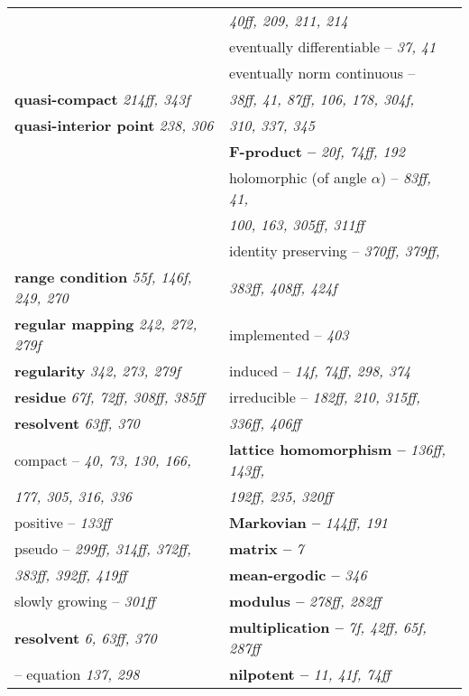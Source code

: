 \begin{longtable}{p{}p{}}
& \quad\quad \textit{40ff, 209, 211, 214} \\
& \quad eventually differentiable -- \textit{37, 41} \\
& \quad eventually norm continuous -- \\
\textbf{quasi-compact} \textit{214ff, 343f} & \quad\quad \textit{38ff, 41, 87ff, 106, 178, 304f,} \\
\textbf{quasi-interior point} \textit{238, 306} & \quad\quad \textit{310, 337, 345} \\
& \textbf{F-product --} \textit{20f, 74ff, 192} \\
& \quad holomorphic (of angle $ \alpha $) -- \textit{83ff, 41,} \\
& \quad\quad \textit{100, 163, 305ff, 311ff} \\
& \quad identity preserving -- \textit{370ff, 379ff,} \\
\textbf{range condition} \textit{55f, 146f, 249, 270} & \quad\quad \textit{383ff, 408ff, 424f} \\
\textbf{regular mapping} \textit{242, 272, 279f} & \quad implemented -- \textit{403} \\
\textbf{regularity} \textit{342, 273, 279f} & \quad induced -- \textit{14f, 74ff, 298, 374} \\
\textbf{residue} \textit{67f, 72ff, 308ff, 385ff} & \quad irreducible -- \textit{182ff, 210, 315ff,} \\
\textbf{resolvent} \textit{63ff, 370} & \quad\quad \textit{336ff, 406ff} \\
\quad compact -- \textit{40, 73, 130, 166,} & \textbf{lattice homomorphism --} \textit{136ff, 143ff,} \\
\quad\quad \textit{177, 305, 316, 336} & \quad\quad \textit{192ff, 235, 320ff} \\
\quad positive -- \textit{133ff} & \textbf{Markovian --} \textit{144ff, 191} \\
\quad pseudo -- \textit{299ff, 314ff, 372ff,} & \textbf{matrix --} \textit{7} \\
\quad\quad \textit{383ff, 392ff, 419ff} & \textbf{mean-ergodic --} \textit{346} \\
\quad slowly growing -- \textit{301ff} & \textbf{modulus --} \textit{278ff, 282ff} \\
\textbf{resolvent} \textit{6, 63ff, 370} & \textbf{multiplication --} \textit{7f, 42ff, 65f, 287ff} \\
\quad -- equation \textit{137, 298} & \textbf{nilpotent --} \textit{11, 41f, 74ff} \\

\end{longtable}
